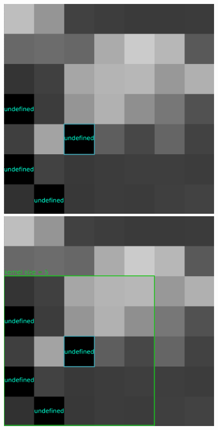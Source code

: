 \documentclass[12pt, a4paper]{report}
\begin{document}
	\begin{figure}[h!]
		\centering
		\begin{minipage}{0.45\columnwidth}
			\centering
			\includegraphics[width=\linewidth]{../images/gaussian_image.png}
		\end{minipage}
		\begin{minipage}{0.45\columnwidth}
			\centering
			\includegraphics[width=\linewidth]{../images/gaussian_kernel1.png}

\end{minipage}
\end{figure}
\end{document}

